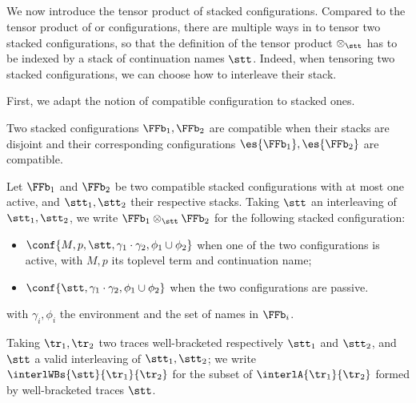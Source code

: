 \subsection{\WBOGS}
\label{a:tensor-wbogs}

  
We now introduce the tensor product of stacked configurations.
Compared to the tensor product of \COGS or \AOGS configurations,
there are multiple ways in \WBOGS
to tensor two stacked configurations, so that the definition of the 
tensor product $\otimes_{\stt}$ has to be 
indexed by a stack of continuation names $\stt$.
Indeed, when tensoring two stacked configurations, we can
choose how to interleave their stack.

First, we adapt the notion of compatible configuration
to stacked ones.
\begin{definition}
 Two stacked configurations $\FFb_1,\FFb_2$ are compatible 
 when their stacks are disjoint and 
 their corresponding \AOGS
 configurations $\es{\FFb_1},\es{\FFb_2}$ are compatible.
\end{definition}


\begin{definition}
Let $\FFb_1$ and $\FFb_2$ be two compatible stacked configurations
with at most one active,
and $\stt_1,\stt_2$ their respective stacks.  
Taking $\stt$ an interleaving of $\stt_1,\stt_2$,
we write $\FFb_1 \otimes_{\stt} \FFb_2$ for the following 
stacked configuration:
\begin{itemize}
 \item $\conf{M,p,\stt,\gamma_1 \cdot \gamma_2,\phi_1 \cup \phi_2}$
 when one of the two configurations is active, with $M,p$
 its toplevel term and continuation name;
 \item $\conf{\stt,\gamma_1 \cdot \gamma_2,\phi_1 \cup \phi_2}$
 when the two configurations are passive.
\end{itemize}
with $\gamma_i,\phi_i$ the environment and the set of names in $\FFb_i$.
\end{definition}
\noindent
Taking $\tr_1,\tr_2$ two traces well-bracketed 
\wrt respectively $\stt_1$ and $\stt_2$,
and $\stt$ a valid interleaving of 
$\stt_1,\stt_2$;
we write $\interlWBs{\stt}{\tr_1}{\tr_2}$ for the subset of $\interlA{\tr_1}{\tr_2}$
formed by well-bracketed traces \wrt $\stt$.


